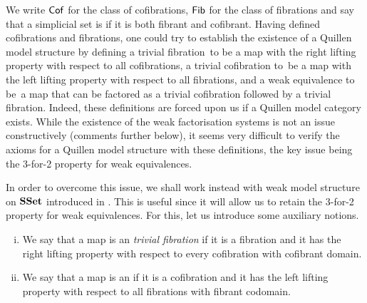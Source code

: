\documentclass[reqno,10pt,a4paper,oneside,draft]{amsart}
\begin{document}
\medskip

We write $\mathsf{Cof}$ for the class of cofibrations, $\mathsf{Fib}$ for the class of fibrations and say that a simplicial set is  if it is both fibrant and cofibrant. Having defined cofibrations and fibrations, one could try to establish the existence of a Quillen model structure by defining a trivial fibration~to be a map with the right lifting property with respect to all cofibrations, a trivial cofibration to~be a map with the left lifting property with respect to all fibrations, and a weak equivalence to be~a map that can be factored as a trivial cofibration followed by a trivial fibration. Indeed, 
these definitions are forced upon us if a Quillen model category exists. While the existence of the weak
factorisation systems is not an issue constructively (\cf comments further below), it seems  very difficult to verify the axioms for a Quillen model structure with these definitions, the key issue being  the  3-for-2 property for weak equivalences.  

\medskip

In order to overcome this issue, we shall work instead with weak model structure on $\mathbf{SSet}$ introduced  in \cite{henry2018wms}. This is useful since it will allow us to retain the 3-for-2 property for weak equivalences. 
For this, let us introduce some auxiliary notions. 


\begin{definition} \hfill
\begin{enumerate}[(i)]
\item We say that a map is an \emph{trivial fibration} if it is a fibration and it has the right lifting property
with respect to every cofibration with cofibrant domain.
\item We say that a map is an  if it is a cofibration and it has the left lifting property with respect to all fibrations with fibrant codomain.
\end{enumerate}
\end{definition}
\end{document}

